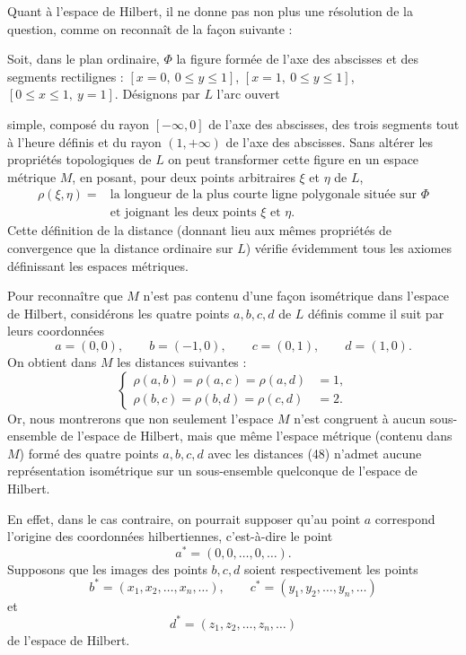 \documentclass[a4paper,12pt]{amsart}
\newcommand{\srcpage}[1]{} %
\begin{document}
Quant à l'espace de Hilbert, il ne donne pas non plus une résolution de la question, comme on reconnaît de la façon suivante :

Soit, dans le plan ordinaire, $\Phi$ la figure formée de l'axe des abscisses et des segments rectilignes : $[x=0,\ 0\le y\le1]$, $[x=1,\ 0\le y\le1]$, $[0\le x\le1,\ y=1]$. Désignons par $L$ l'arc ouvert
\srcpage{89}
simple, composé du rayon $[-\infty,0]$ de l'axe des abscisses, des trois segments tout à l'heure définis et du rayon $(1,+\infty)$ de l'axe des abscisses. Sans altérer les propriétés topologiques de $L$ on peut transformer cette figure en un espace métrique $M$, en posant, pour deux points arbitraires $\xi$ et $\eta$ de $L$,
\[
\begin{aligned}
\rho(\xi,\eta)={}&\text{la longueur de la plus courte ligne polygonale située sur $\Phi$}\\
&\text{et joignant les deux points $\xi$ et $\eta$.}
\end{aligned}
\]
Cette définition de la distance (donnant lieu aux mêmes propriétés de convergence que la distance ordinaire sur $L$) vérifie évidemment tous les axiomes définissant les espaces métriques.

Pour reconnaître que $M$ n'est pas contenu d'une façon isométrique dans l'espace de Hilbert, considérons les quatre points $a,b,c,d$ de $L$ définis comme il suit par leurs coordonnées
\[a=(0,0),\qquad b=(-1,0),\qquad c=(0,1),\qquad d=(1,0).\]
On obtient dans $M$ les distances suivantes :
\begin{equation}
\left\{\begin{aligned}\rho(a,b)=\rho(a,c)=\rho(a,d)&=1,\\\rho(b,c)=\rho(b,d)=\rho(c,d)&=2.\end{aligned}\right.\tag{48}
\end{equation}
Or, nous montrerons que non seulement l'espace $M$ n'est congruent à aucun sous-ensemble de l'espace de Hilbert, mais que même l'espace métrique (contenu dans $M$) formé des quatre points $a,b,c,d$ avec les distances (48) n'admet aucune représentation isométrique sur un sous-ensemble quelconque de l'espace de Hilbert.

En effet, dans le cas contraire, on pourrait supposer qu'au point $a$ correspond l'origine des coordonnées hilbertiennes, c'est-à-dire le point
\[a^*=(0,0,\ldots,0,\ldots).\]
Supposons que les images des points $b,c,d$ soient respectivement les points
\[b^*=(x_1,x_2,\ldots,x_n,\ldots),\qquad c^*=(y_1,y_2,\ldots,y_n,\ldots)\]
et
\[d^*=(z_1,z_2,\ldots,z_n,\ldots)\]
de l'espace de Hilbert.
\end{document}
